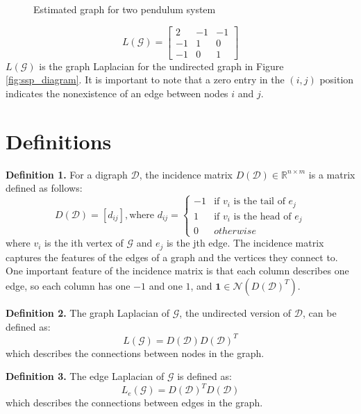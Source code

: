 \documentclass[conference]{IEEEtran}
\begin{document}
\begin{figure}[htbp]
    \centering
    \caption{Estimated graph for two pendulum system}
    \label{ssp_graph}
\end{figure}

$$
L(\mathcal{G}) = \begin{bmatrix}
    2 & -1 & -1\\
    -1 & 1 & 0\\
    -1 & 0 & 1
\end{bmatrix}
$$
$L(\mathcal{G})$ is the graph Laplacian for the undirected graph in Figure \ref{fig:ssp_diagram}. It is important to note that a zero entry in the $(i,j)$ position indicates the nonexistence of an edge between nodes $i$ and $j$.

\section{Definitions}

\noindent\textbf{Definition 1.} For a digraph $\mathcal{D}$, the incidence matrix $D(\mathcal{D})\in\mathbb{R}^{n\times m}$ is a matrix defined as follows:
$$
D(\mathcal{D})=\left[d_{ij}\right],\text{where }d_{ij}=
\begin{cases}
    -1 & \text{if }v_i\text{ is the tail of }e_j\\
    1 & \text{if }v_i\text{ is the head of }e_j\\
    0 & otherwise
\end{cases}
$$
where $v_i$ is the ith vertex of $\mathcal{G}$ and $e_j$ is the jth edge. The incidence matrix captures the features of the edges of a graph and the vertices they connect to.
One important feature of the incidence matrix is that each column describes one edge, so each column has one $-1$ and one $1$, and $\mathbf{1}\in\mathcal{N}(D(\mathcal{D})^T)$.

\noindent\textbf{Definition 2.} The graph Laplacian of $\mathcal{G}$, the undirected version of $\mathcal{D}$, can be defined as:
$$
L(\mathcal{G})=D(\mathcal{D})D(\mathcal{D})^T
$$
which describes the connections between nodes in the graph.

\noindent\textbf{Definition 3.} The edge Laplacian of $\mathcal{G}$ is defined as:
$$
L_e(\mathcal{G})=D(\mathcal{D})^TD(\mathcal{D})
$$
which describes the connections between edges in the graph.
\end{document}

